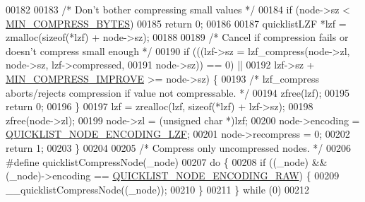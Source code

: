 \begin{DoxyCode}
{00182 
00183     \textcolor{comment}{/* Don't bother compressing small values */}
00184     \textcolor{keywordflow}{if} (node->sz < \hyperlink{quicklist_8c_a989cf7105ffb35b180ab70754f7afd85}{MIN\_COMPRESS\_BYTES})
00185         \textcolor{keywordflow}{return} 0;
00186 
00187     quicklistLZF *lzf = zmalloc(\textcolor{keyword}{sizeof}(*lzf) + node->sz);
00188 
00189     \textcolor{comment}{/* Cancel if compression fails or doesn't compress small enough */}
00190     \textcolor{keywordflow}{if} (((lzf->sz = lzf\_compress(node->zl, node->sz, lzf->compressed,
00191                                  node->sz)) == 0) ||
00192         lzf->sz + \hyperlink{quicklist_8c_a70ca98f16c31d31db1ff733799d31a41}{MIN\_COMPRESS\_IMPROVE} >= node->sz) \{
00193         \textcolor{comment}{/* lzf\_compress aborts/rejects compression if value not compressable. */}
00194         zfree(lzf);
00195         \textcolor{keywordflow}{return} 0;
00196     \}
00197     lzf = zrealloc(lzf, \textcolor{keyword}{sizeof}(*lzf) + lzf->sz);
00198     zfree(node->zl);
00199     node->zl = (\textcolor{keywordtype}{unsigned} \textcolor{keywordtype}{char} *)lzf;
00200     node->encoding = \hyperlink{quicklist_8h_a6ce238912d4049e020b686def25c9566}{QUICKLIST\_NODE\_ENCODING\_LZF};
00201     node->recompress = 0;
00202     \textcolor{keywordflow}{return} 1;
00203 \}
00204 
00205 \textcolor{comment}{/* Compress only uncompressed nodes. */}
00206 \textcolor{preprocessor}{#}\textcolor{preprocessor}{define} \textcolor{preprocessor}{quicklistCompressNode}\textcolor{preprocessor}{(}\textcolor{preprocessor}{\_node}\textcolor{preprocessor}{)}
00207     \textcolor{keywordflow}{do} \textcolor{preprocessor}{\{}
00208         \textcolor{keywordflow}{if} \textcolor{preprocessor}{(}\textcolor{preprocessor}{(}\textcolor{preprocessor}{\_node}\textcolor{preprocessor}{)} \textcolor{preprocessor}{&&} \textcolor{preprocessor}{(}\textcolor{preprocessor}{\_node}\textcolor{preprocessor}{)}\textcolor{preprocessor}{->}\textcolor{preprocessor}{encoding} \textcolor{preprocessor}{==} \hyperlink{quicklist_8h_a064c051a8fda9aa87dc3556b9cafc911}{QUICKLIST\_NODE\_ENCODING\_RAW}\textcolor{preprocessor}{)} \textcolor{preprocessor}{\{}
00209             \textcolor{preprocessor}{\_\_quicklistCompressNode}\textcolor{preprocessor}{(}\textcolor{preprocessor}{(}\textcolor{preprocessor}{\_node}\textcolor{preprocessor}{)}\textcolor{preprocessor}{)}\textcolor{preprocessor}{;}
00210         \textcolor{preprocessor}{\}}
00211     \textcolor{preprocessor}{\}} \textcolor{keywordflow}{while} \textcolor{preprocessor}{(}0\textcolor{preprocessor}{)}
00212 
}
\end{DoxyCode}
